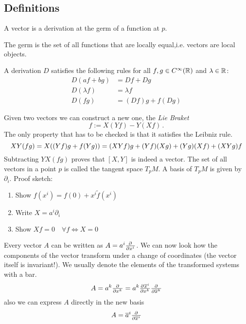 \subsection*{Definitions}
\begin{definition}[Algebraic]
A vector is a derivation at the germ of a function at $p$.
\end{definition}
The germ is the set of all functions that are locally equal,i.e. vectors are local objects.
\begin{definition}[Derivation]
A derivation $D$ satisfies the following rules for all $f,g\in C^\infty(\mathbb{R})$ and $\lambda \in \mathbb{R}$:
\begin{align}
    D(af+bg) &=Df+Dg\\
    D(\lambda f)&=\lambda f\\
    D(fg)&= (Df)g+f(Dg)
\end{align}
\end{definition}
Given two vectors we can construct a new one, the \emph{Lie Braket}
\begin{equation}
    [X,Y]f:=X(Yf)-Y(Xf)\, .
\end{equation}
The only property that has to be checked is that it satisfies the Leibniz rule.
\begin{equation}
    XY(fg)=X((Yf)g+f(Yg))=(XYf)g+(Yf)(Xg)+(Yg)(Xf)+(XYg)f\\
\end{equation}
Subtracting $YX(fg)$ proves that $[X,Y]$ is indeed a vector.
The set of all vectors in a point $p$ is called the tangent space $T_pM$. A basis of $T_pM$ is given by $\partial_i$.
Proof sketch:
\begin{enumerate}
    \item Show $f(x^i)=f(0)+x^i\tilde{f}(x^i)$
    \item Write $X=a^i\partial_i$
    \item Show $Xf=0\quad \forall f \iff X=0$
\end{enumerate}
Every vector $A$ can be written as $A=a^i\pd{}{{x^i}}$. We can now look how the components of the vector transform 
under a change of coordinates (the vector itself is invariant!). We usually denote the elements of the transformed systems with a bar.
\begin{equation}
    A= a^k\pd{}{{x^k}}= a^k\pd{\overline{x}^i}{{x^k}}\pd{}{{\overline{x}^k}}
\end{equation}
also we can express $A$ directly in the new basis
\begin{equation}
    A= \overline{a}^i\pd{}{{\overline{x}^i}}
\end{equation}
